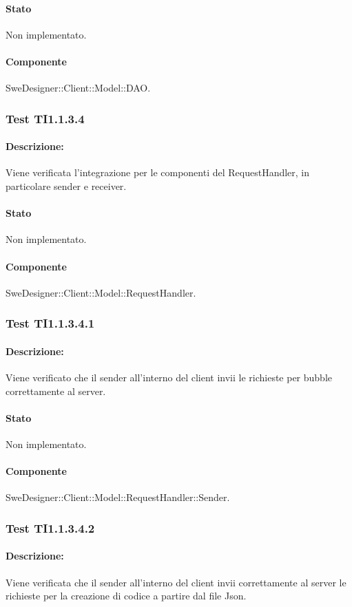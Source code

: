 \documentclass[../PianoDiQualifica.tex]{subfiles}
\begin{document}
	\paragraph{Stato} Non implementato.
	\paragraph{Componente} SweDesigner::Client::Model::DAO.
	\subsubsection{Test TI1.1.3.4}
	\paragraph{Descrizione:} Viene verificata l'integrazione per le componenti del RequestHandler, in particolare sender e receiver.
	\paragraph{Stato} Non implementato.
	\paragraph{Componente} SweDesigner::Client::Model::RequestHandler.
	\subsubsection{Test TI1.1.3.4.1}
	\paragraph{Descrizione:} Viene verificato che il sender all'interno del client invii le richieste per bubble correttamente al server.
	\paragraph{Stato} Non implementato.
	\paragraph{Componente} SweDesigner::Client::Model::RequestHandler::Sender.
	
	\subsubsection{Test TI1.1.3.4.2}
	\paragraph{Descrizione:} Viene verificata che il sender all'interno del client invii  correttamente al server le richieste per la creazione di codice a partire dal file Json.
\end{document}
